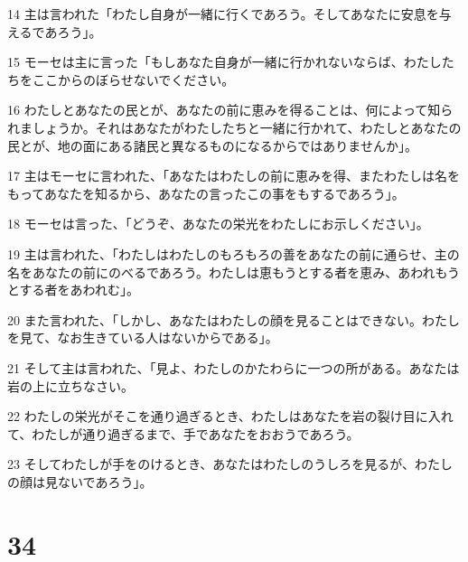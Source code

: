 \par 14 主は言われた「わたし自身が一緒に行くであろう。そしてあなたに安息を与えるであろう」。
\par 15 モーセは主に言った「もしあなた自身が一緒に行かれないならば、わたしたちをここからのぼらせないでください。
\par 16 わたしとあなたの民とが、あなたの前に恵みを得ることは、何によって知られましょうか。それはあなたがわたしたちと一緒に行かれて、わたしとあなたの民とが、地の面にある諸民と異なるものになるからではありませんか」。
\par 17 主はモーセに言われた、「あなたはわたしの前に恵みを得、またわたしは名をもってあなたを知るから、あなたの言ったこの事をもするであろう」。
\par 18 モーセは言った、「どうぞ、あなたの栄光をわたしにお示しください」。
\par 19 主は言われた、「わたしはわたしのもろもろの善をあなたの前に通らせ、主の名をあなたの前にのべるであろう。わたしは恵もうとする者を恵み、あわれもうとする者をあわれむ」。
\par 20 また言われた、「しかし、あなたはわたしの顔を見ることはできない。わたしを見て、なお生きている人はないからである」。
\par 21 そして主は言われた、「見よ、わたしのかたわらに一つの所がある。あなたは岩の上に立ちなさい。
\par 22 わたしの栄光がそこを通り過ぎるとき、わたしはあなたを岩の裂け目に入れて、わたしが通り過ぎるまで、手であなたをおおうであろう。
\par 23 そしてわたしが手をのけるとき、あなたはわたしのうしろを見るが、わたしの顔は見ないであろう」。

\chapter{34}

